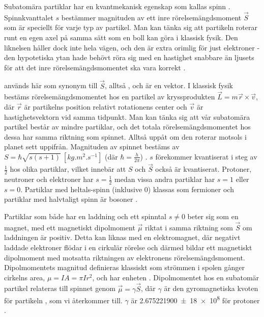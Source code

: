 \documentclass[11pt, a4paper]{article}
\begin{document}
Subatomära partiklar har en kvantmekanisk egenskap som kallas spinn \parencite{college_physics}. Spinnkvanttalet $s$ bestämmer magnituden av ett inre rörelsemängdsmoment $\vec{S}$ som är speciellt för varje typ av partikel. Man kan tänka sig att partikeln roterar runt en egen axel på samma sätt som en boll kan göra i klassisk fysik. Den liknelsen håller dock inte hela vägen, och den är extra orimlig för just elektroner - den hypotetiska ytan hade behövt röra sig med en hastighet snabbare än ljusets för att det inre rörelsemängdsmomentet ska vara korrekt \parencite{electron_spin}. 

 används här som synonym till $\vec{S}$, alltså , och är en vektor. I klassisk fysik bestäms rörelse\-mängdsmomentet hos en partikel av kryssprodukten $\vec{L}=m\vec{r}\times\vec{v}$, där $\vec{r}$ är partikelns position relativt rotationens center och $\vec{v}$ är hastighetsvektorn vid samma tidpunkt. Man kan tänka sig att vår subatomära partikel består av mindre partiklar, och det totala rörelsemängdsmomentet hos dessa har samma riktning som spinnet. Alltså uppåt om den roterar motsols i planet sett uppifrån. Magnituden av spinnet bestäms av $S=\hbar\sqrt{s(s+1)}\:\left[\si{kg.m^2.s^{-1}}\right]$ (där $\hbar=\frac{h}{2\pi}$) \parencite{college_physics}. $s$ förekommer kvantiserat i steg av $\frac{1}{2}$ hos olika partiklar, vilket innebär att $S$ och $\vec{S}$ också är kvantiserat. Protoner, neutroner och elektroner har $s=\frac{1}{2}$ medan vissa andra partiklar har $s=1$ eller $s=0$. Partiklar med heltals-spinn (inklusive 0) klassas som fermioner och partiklar med halvtaligt spinn är bosoner \parencite{subatomic_particles}.

Partiklar som både har en laddning och ett spinntal $s\neq 0$ beter sig som en magnet, med ett magnetiskt dipolmoment $\vec{\mu}$ riktat i samma riktning som $\vec{S}$ om laddningen är positiv. Detta kan liknas med en elektromagnet, där negativt laddade elektroner flödar i en cirkulär rörelse och därmed bildar ett magnetiskt dipolmoment med motsatta riktningen av elektronens rörelsemängdsmoment. Dipolmomentets magnitud definieras klassiskt som strömmen i spolen gånger cirkelns area, $\mu=IA=\pi Ir^2$, och har enheten \si{\left[A.m^2\right]} \parencite{magnetism}. Dipolmomentet hos en subatomär partikel relateras till spinnet genom $\vec{\mu}=\gamma\vec{S}$, där $\gamma$ är den gyromagnetiska kvoten för partikeln \parencite{larmor_precession}, som vi återkommer till. $\gamma$ är \SI{2.675 221 900(18) e8}{\left[s^{-1}.T^{-1}\right]} för protoner \parencite{gyro_ratio}. 
\end{document}
